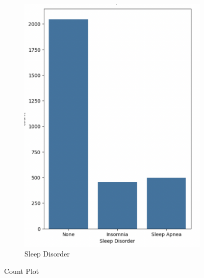 \documentclass[10pt,twocolumn,letterpaper]{article}
\begin{document}
\begin{figure}[H]
\begin{subfigure}{.3\textwidth}
  \includegraphics[width=0.7\linewidth]{countplot2.png}
  \captionsetup{justification=raggedright, singlelinecheck=false} %
  \caption{Sleep Disorder}
  
  \label{fig:sub2}
\end{subfigure}
    
    \captionsetup{justification=centering}
    \caption{Count Plot}
    
    \label{fig:test}
\end{figure}

\end{document}
